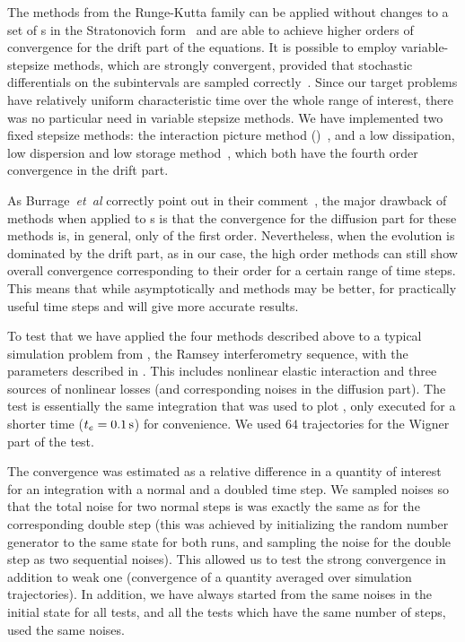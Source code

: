 The methods from the Runge-Kutta family can be applied without changes to a set of s in the Stratonovich form~\cite{Wilkie2004,Wilkie2005} and are able to achieve higher orders of convergence for the drift part of the equations.
It is possible to employ variable-stepsize methods, which are strongly convergent, provided that stochastic differentials on the subintervals are sampled correctly~\cite{Wilkie2005}.
Since our target problems have relatively uniform characteristic time over the whole range of interest, there was no particular need in variable stepsize methods.
We have implemented two fixed stepsize  methods: the  interaction picture method ()~\cite{CaradocDavies2000}, and a low dissipation, low dispersion and low storage  method~\cite{Berland2006}, which both have the fourth order convergence in the drift part.

As Burrage~\textit{et~al} correctly point out in their comment~\cite{Burrage2006}, the major drawback of  methods when applied to s is that the convergence for the diffusion part for these methods is, in general, only of the first order.
Nevertheless, when the evolution is dominated by the drift part, as in our case, the high order methods can still show overall convergence corresponding to their order for a certain range of time steps.
This means that while asymptotically  and  methods may be better, for practically useful time steps  and  will give more accurate results.

To test that we have applied the four methods described above to a typical simulation problem from , the Ramsey interferometry sequence, with the parameters described in .
This includes nonlinear elastic interaction and three sources of nonlinear losses (and corresponding noises in the diffusion part).
The test is essentially the same integration that was used to plot , only executed for a shorter time ($t_e=0.1\mbox{\ensuremath{\,\mathrm{s}}}$) for convenience.
We used $64$ trajectories for the Wigner part of the test.

The convergence was estimated as a relative difference in a quantity of interest for an integration with a normal and a doubled time step.
We sampled noises so that the total noise for two normal steps is was exactly the same as for the corresponding double step (this was achieved by initializing the random number generator to the same state for both runs, and sampling the noise for the double step as two sequential noises).
This allowed us to test the strong convergence in addition to weak one (convergence of a quantity averaged over simulation trajectories).
In addition, we have always started from the same noises in the initial state for all tests, and all the tests which have the same number of steps, used the same noises.

